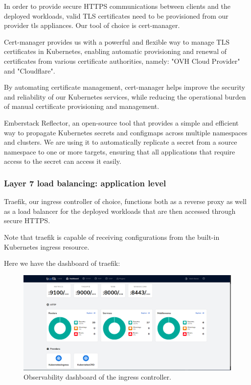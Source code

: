 
\hspace{7mm}In order to provide secure HTTPS communications between clients and the deployed workloads, valid TLS certificates need to be provisioned from our provider tls appliances. Our tool of choice is cert-manager.

\hspace{7mm}Cert-manager provides us with a powerful and flexible way to manage TLS certificates in Kubernetes, enabling automatic provisioning and renewal of certificates from various certificate authorities, namely: "OVH Cloud Provider" and "Cloudflare".

\hspace{7mm}By automating certificate management, cert-manager helps improve the security and reliability of our Kubernetes services, while reducing the operational burden of manual certificate provisioning and management.


\hspace{7mm}Emberstack Reflector, an open-source tool that provides a simple and efficient way to propagate Kubernetes secrets and configmaps across multiple namespaces and clusters. We are using it to automatically replicate a secret from a source namespace to one or more targets, ensuring that all applications that require access to the secret can access it easily.

\subsubsection{Layer 7 load balancing: application level }

\hspace{7mm}Traefik, our ingress controller of choice, functions both as a reverse proxy as well as a load balancer for the deployed workloads that are then accessed through secure HTTPS. 

\hspace{7mm}Note that traefik is capable of receiving configurations from the built-in Kubernetes ingress resource. 

\hspace{7mm}Here we have the dashboard of traefik: 

\begin{figure}[H]\centering
\includegraphics[width=1.0\textwidth,angle=00]{assets/f25.png}
\caption{ Observability dashboard of the ingress controller. }
\label{fig:dashboard of traefik}
\end{figure}

